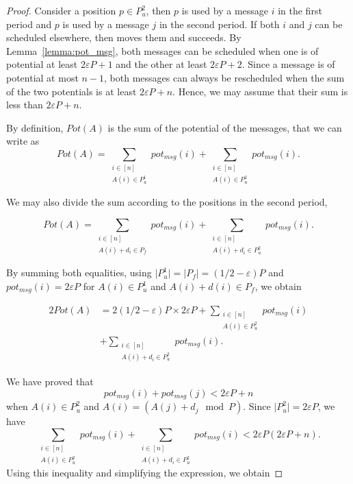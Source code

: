\documentclass[pdflatex,sn-mathphys,iicol]{sn-jnl}%
\theoremstyle{thmstyleone}%
\theoremstyle{thmstyletwo}%
\theoremstyle{thmstylethree}%
\begin{document}
\begin{proof}
Consider a position $p \in P^2_u$, then $p$ is used by a message $i$ in the first period and $p$ is used by a message $j$ in the second period. If both $i$ and $j$ can be scheduled elsewhere, then \swapandmove moves them and succeeds. 
By Lemma~\ref{lemma:pot_msg}, both messages can be scheduled when one is of potential at least $2\varepsilon P + 1$ and the other at least $2\varepsilon P + 2$. 
Since a message is of potential at most $n-1$, both messages can always be rescheduled when the sum of the two potentials is at least $2\varepsilon P + n$. Hence, we may assume that their sum is less than $2 \varepsilon P + n$. 

By definition, $Pot(A)$ is the sum of the potential of the messages, that we can write as 
$$Pot(A) = \sum_{\substack{i \in [n] \\ A(i) \in P^1_u} } pot_{msg}(i) + \sum_{\substack{i \in [n] \\ A(i) \in P^2_u} } pot_{msg}(i).$$

We may also divide the sum according to the positions in the second period,

$$Pot(A) = \sum_{\substack{i \in [n] \\ A(i) + d_i \in P_f} } pot_{msg}(i) + \sum_{\substack{i \in [n] \\ A(i) + d_i \in P^2_u} } pot_{msg}(i).$$

By summing both equalities, using $\lvert P^1_u\rvert = \lvert P_f\rvert = (1/2 - \varepsilon)P$ and 
$pot_{msg}(i) = 2\varepsilon P$ for $A(i) \in P^1_u$ and  $A(i) + d(i) \in P_f$, we obtain  

\begin{equation}
  \begin{aligned}
    2Pot(A) & = 2(1/2 - \varepsilon)P \times 2\varepsilon P + \sum_{\substack{i \in [n] \\ A(i) \in P^2_u} } pot_{msg}(i) \\
		  & + \sum_{\substack{i \in [n] \\ A(i) + d_i \in P^2_u} } pot_{msg}(i).
  \end{aligned}
\end{equation}




We have proved that $$pot_{msg}(i) + pot_{msg}(j) < 2\varepsilon P + n$$ when $A(i) \in P^2_u$ and $A(i) = (A(j) + d_j \mod P)$. Since  $\lvert P^2_u\rvert = 2\varepsilon P$, we have $$\sum_{\substack{i \in [n] \\ A(i) \in P^2_u} } pot_{msg}(i) + \sum_{\substack{i \in [n] \\ A(i) + d_i \in P^2_u} } pot_{msg}(i) < 2\varepsilon P(2\varepsilon P + n).$$
Using this inequality and simplifying the expression, we obtain 



\end{proof}
\end{document}
